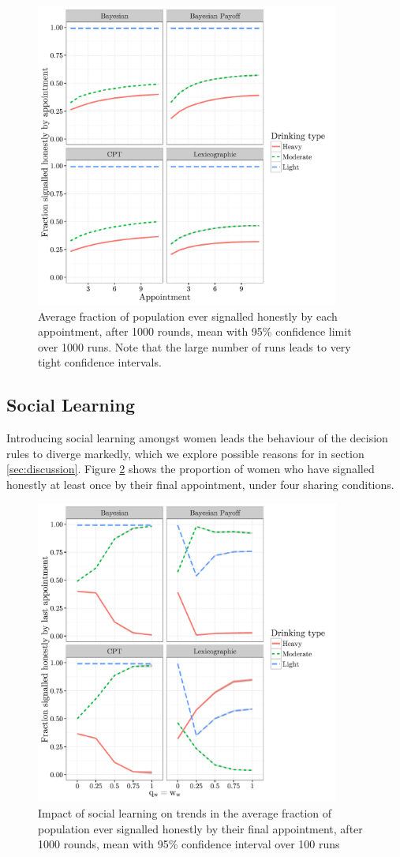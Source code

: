 \documentclass[graybox]{svmult}
\begin{document}
\begin{figure}[H]
\includegraphics[width=100mm]{figures/honesty_plot}
\caption{Average fraction of population ever signalled honestly by each appointment, after 1000 rounds, mean with 95\% confidence limit over 1000 runs. Note that the large number of runs leads to very tight confidence intervals.\label{fig:honest_signals}}
\end{figure}

\subsection{Social Learning}
\label{sub:sharing_results}

Introducing social learning amongst women leads the behaviour of the decision rules to diverge markedly, which we explore possible reasons for in section \ref{sec:discussion}. Figure \ref{fig:honest_sharing} shows the proportion of women who have signalled honestly at least once by their final appointment, under four sharing conditions. 

\begin{figure}[H]
\includegraphics[width=100mm]{figures/honesty_sharing}
\caption{Impact of social learning on trends in the average fraction of population ever signalled honestly by their final appointment, after 1000 rounds, mean with 95\% confidence interval over 100 runs}
\label{fig:honest_sharing}
\end{figure}
\end{document}
